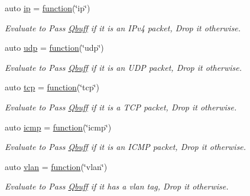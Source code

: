 \begin{DoxyCompactItemize}
auto \hyperlink{namespacepfq_1_1lang_1_1anonymous__namespace_02default_8hpp_03_a738d1b52bf88feb4f7b1a17b97cdc8df}{ip} = \hyperlink{namespacepfq_1_1lang_a1a4638059d700ae08d0ca63886ff2bb3}{function}(\char`\"{}ip\char`\"{})
\begin{DoxyCompactList}\small\item\em Evaluate to {\ttfamily Pass} \hyperlink{structpfq_1_1lang_1_1Qbuff}{Qbuff} if it is an I\+Pv4 packet, {\ttfamily Drop} it otherwise. \end{DoxyCompactList}\item 
auto \hyperlink{namespacepfq_1_1lang_1_1anonymous__namespace_02default_8hpp_03_a0b8b927aad3be7034521ebde0dabf7d3}{udp} = \hyperlink{namespacepfq_1_1lang_a1a4638059d700ae08d0ca63886ff2bb3}{function}(\char`\"{}udp\char`\"{})
\begin{DoxyCompactList}\small\item\em Evaluate to {\ttfamily Pass} \hyperlink{structpfq_1_1lang_1_1Qbuff}{Qbuff} if it is an U\+DP packet, {\ttfamily Drop} it otherwise. \end{DoxyCompactList}\item 
auto \hyperlink{namespacepfq_1_1lang_1_1anonymous__namespace_02default_8hpp_03_a5b8ca91a33a120e7e0807e63c8b51b28}{tcp} = \hyperlink{namespacepfq_1_1lang_a1a4638059d700ae08d0ca63886ff2bb3}{function}(\char`\"{}tcp\char`\"{})
\begin{DoxyCompactList}\small\item\em Evaluate to {\ttfamily Pass} \hyperlink{structpfq_1_1lang_1_1Qbuff}{Qbuff} if it is a T\+CP packet, {\ttfamily Drop} it otherwise. \end{DoxyCompactList}\item 
auto \hyperlink{namespacepfq_1_1lang_1_1anonymous__namespace_02default_8hpp_03_a3becf93771a800904f002e39b1cc388f}{icmp} = \hyperlink{namespacepfq_1_1lang_a1a4638059d700ae08d0ca63886ff2bb3}{function}(\char`\"{}icmp\char`\"{})
\begin{DoxyCompactList}\small\item\em Evaluate to {\ttfamily Pass} \hyperlink{structpfq_1_1lang_1_1Qbuff}{Qbuff} if it is an I\+C\+MP packet, {\ttfamily Drop} it otherwise. \end{DoxyCompactList}\item 
auto \hyperlink{namespacepfq_1_1lang_1_1anonymous__namespace_02default_8hpp_03_a747e907a678ad69c5bfdd3048a239b6a}{vlan} = \hyperlink{namespacepfq_1_1lang_a1a4638059d700ae08d0ca63886ff2bb3}{function}(\char`\"{}vlan\char`\"{})
\begin{DoxyCompactList}\small\item\em Evaluate to {\ttfamily Pass} \hyperlink{structpfq_1_1lang_1_1Qbuff}{Qbuff} if it has a vlan tag, {\ttfamily Drop} it otherwise. \end{DoxyCompactList}\item 

\end{DoxyCompactItemize}
